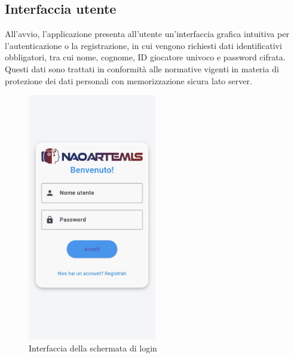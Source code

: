\documentclass{optica-article}
\begin{document}
\subsection{Interfaccia utente}
All'avvio, l'applicazione presenta all'utente un'interfaccia grafica intuitiva per l'autenticazione o la registrazione, in cui vengono richiesti dati identificativi obbligatori, tra cui nome, cognome, ID giocatore univoco e password cifrata. Questi dati sono trattati in conformit\`a alle normative vigenti in materia di protezione dei dati personali con memorizzazione sicura lato server.
\begin{figure}[H]
    \centering
    \includegraphics[width=0.5\textwidth]{figures/creaaccount_app.jpg}
    \caption{Interfaccia della schermata di login}
    \label{fig:registrazione}
\end{figure}
\end{document}
